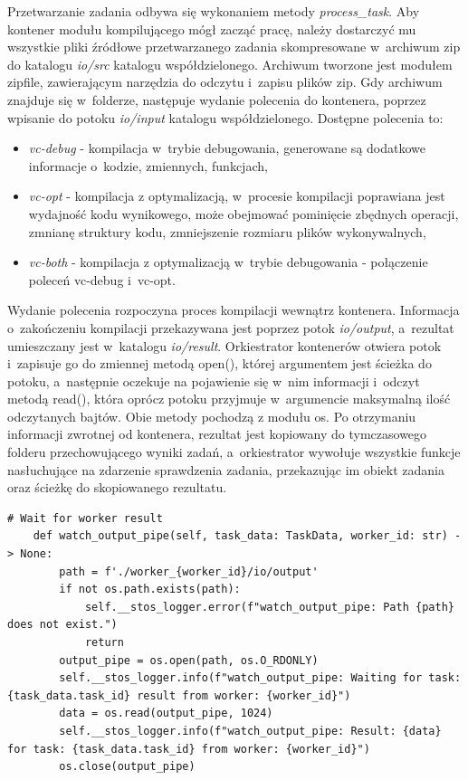 Przetwarzanie zadania odbywa się wykonaniem metody \textit{process\_task}. Aby kontener modułu kompilującego mógł zacząć pracę, należy dostarczyć mu wszystkie pliki źródłowe przetwarzanego zadania skompresowane w~archiwum zip do katalogu \textit{io/src} katalogu współdzielonego. Archiwum tworzone jest modułem zipfile\cite{pythonZipfile}, zawierającym narzędzia do odczytu i~zapisu plików zip. Gdy archiwum znajduje się w~folderze, następuje wydanie polecenia do kontenera, poprzez wpisanie do potoku \textit{io/input} katalogu współdzielonego. Dostępne polecenia to:
\begin{itemize}
    \item \textit{vc-debug} - kompilacja w~trybie debugowania, generowane są dodatkowe informacje o~kodzie, zmiennych, funkcjach,
    \item \textit{vc-opt} - kompilacja z optymalizacją, w~procesie kompilacji poprawiana jest wydajność kodu wynikowego, może obejmować pominięcie zbędnych operacji, zmnianę struktury kodu, zmniejszenie rozmiaru plików wykonywalnych,
    \item \textit{vc-both} - kompilacja z optymalizacją w~trybie debugowania - połączenie poleceń vc-debug i~vc-opt.
\end{itemize}
Wydanie polecenia rozpoczyna proces kompilacji wewnątrz kontenera. Informacja o~zakończeniu kompilacji przekazywana jest poprzez potok \textit{io/output}, a~rezultat umieszczany jest w~katalogu \textit{io/result}. Orkiestrator kontenerów otwiera potok i~zapisuje go do zmiennej metodą open(), której argumentem jest ścieżka do potoku, a~następnie oczekuje na pojawienie się w~nim informacji i~odczyt metodą read(), która oprócz potoku przyjmuje w~argumencie maksymalną ilość odczytanych bajtów. Obie metody pochodzą z modułu os\cite{pytohnOs}. Po otrzymaniu informacji zwrotnej od kontenera, rezultat jest kopiowany do tymczasowego folderu przechowującego wyniki zadań, a~orkiestrator wywołuje wszystkie funkcje nasłuchujące na zdarzenie sprawdzenia zadania, przekazując im obiekt zadania oraz ścieżkę do skopiowanego rezultatu.

\lstset{style=python}
\begin{lstlisting}[caption = {Implementacja metody odczytującej informacje z potoku.}]
    # Wait for worker result 
    def watch_output_pipe(self, task_data: TaskData, worker_id: str) -> None:
        path = f'./worker_{worker_id}/io/output'
        if not os.path.exists(path):
            self.__stos_logger.error(f"watch_output_pipe: Path {path} does not exist.")
            return
        output_pipe = os.open(path, os.O_RDONLY)
        self.__stos_logger.info(f"watch_output_pipe: Waiting for task: {task_data.task_id} result from worker: {worker_id}")
        data = os.read(output_pipe, 1024)
        self.__stos_logger.info(f"watch_output_pipe: Result: {data} for task: {task_data.task_id} from worker: {worker_id}")
        os.close(output_pipe)
\end{lstlisting}

